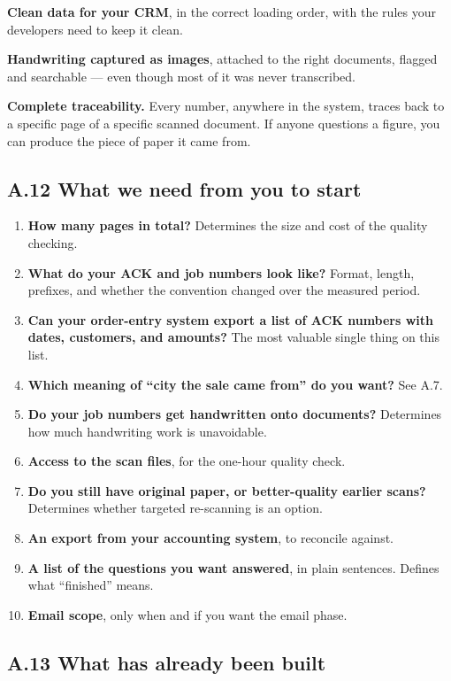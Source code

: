 \documentclass[
]{article}
\providecommand{\tightlist}{%
  \setlength{\itemsep}{0pt}\setlength{\parskip}{0pt}}
\begin{document}
\textbf{Clean data for your CRM}, in the correct loading order, with the
rules your developers need to keep it clean.

\textbf{Handwriting captured as images}, attached to the right
documents, flagged and searchable --- even though most of it was never
transcribed.

\textbf{Complete traceability.} Every number, anywhere in the system,
traces back to a specific page of a specific scanned document. If anyone
questions a figure, you can produce the piece of paper it came from.

\subsection{A.12 What we need from you to
start}\label{a.12-what-we-need-from-you-to-start}

\begin{enumerate}
\def\labelenumi{\arabic{enumi}.}
\tightlist
\item
  \textbf{How many pages in total?} Determines the size and cost of the
  quality checking.
\item
  \textbf{What do your ACK and job numbers look like?} Format, length,
  prefixes, and whether the convention changed over the measured period.
\item
  \textbf{Can your order-entry system export a list of ACK numbers with
  dates, customers, and amounts?} The most valuable single thing on this
  list.
\item
  \textbf{Which meaning of ``city the sale came from'' do you want?} See
  A.7.
\item
  \textbf{Do your job numbers get handwritten onto documents?}
  Determines how much handwriting work is unavoidable.
\item
  \textbf{Access to the scan files}, for the one-hour quality check.
\item
  \textbf{Do you still have original paper, or better-quality earlier
  scans?} Determines whether targeted re-scanning is an option.
\item
  \textbf{An export from your accounting system}, to reconcile against.
\item
  \textbf{A list of the questions you want answered}, in plain
  sentences. Defines what ``finished'' means.
\item
  \textbf{Email scope}, only when and if you want the email phase.
\end{enumerate}

\subsection{A.13 What has already been
built}\label{a.13-what-has-already-been-built}
\end{document}
